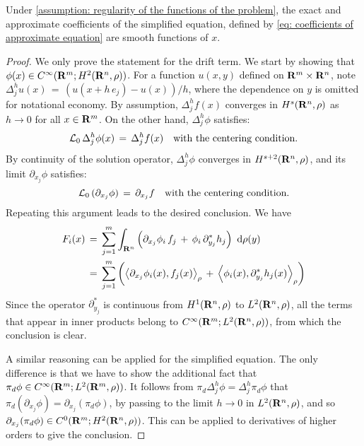 \begin{lemma}
    Under \cref{assumption: regularity of the functions of the problem}, the
    exact and approximate coefficients of the simplified equation, defined by 
    \cref{eq: coefficients of approximate equation} are smooth functions of $x$.
    \begin{proof}
        We only prove the statement for the drift term. We start by showing
        that $\phi(x) \in C^{\infty}(\mathbf R^m; H^{2}(\mathbf R^n, \rho))$.
        For a function $u(x,y)$ defined on $\mathbf R^m \times \mathbf R^n$, note
        $\Delta^h_j u(x)\,=\, (u(x+h\, e_j) - u(x))/h$, where the dependence on
        $y$ is omitted for notational economy. By assumption, $\Delta^h_j
        f(x)$ converges in $H^{s}(\mathbf R^n, \rho)$ as $h \to 0$ for all
        $x \in \mathbf R^m$. On the other hand, $\Delta^h_j \phi$ satisfies:
        $$ 
            \mathcal L_0 \, \Delta^h_j \phi(x) \,=\, \Delta^h_j f(x) \quad \text{with the centering condition}.
        $$
        By continuity of the solution operator, $\Delta^h_j \phi$ converges in
        $H^{s+2}(\mathbf R^n, \rho) $, and its limit $\partial_{x_j} \phi$ satisfies:
        $$ \mathcal L_0 \, (\partial_{x_j} \phi) \,=\, \partial_{x_j} f \quad
        \text{with the centering condition}.$$ Repeating this argument leads to
        the desired conclusion. We have
        \begin{align*}
            F_i(x) &\,=\, \sum^{m}_{j=1}  \int_{\mathbf R^n} \left(\partial_{x_j}\phi_i
                \, f_j\,+\, \phi_i\, \partial_{y_j}^* h_j\right) \,\,\mathrm d \rho(y) \\
            &\,=\, \sum^{m}_{j=1}
            \left(\left \langle \partial_{x_j}\phi_i(x),f_j(x) \right\rangle_{\rho}
                \,+\,\left \langle \phi_i(x),\partial_{y_j}^*h_j(x) \right\rangle_{\rho}\right) 
        \end{align*}
        Since the operator $\partial_{y_j}^*$ is continuous from
        $H^{1}(\mathbf R^n, \rho)$ to $L^{2}(\mathbf R^n,\rho)$, all the
        terms that appear in inner products belong to $C^{\infty}(\mathbf R^m;
            L^{2}(\mathbf R^n,\rho))$, from which the conclusion is clear. 

        A similar reasoning can be applied for the simplified equation. The only difference 
        is that we have to show the additional fact that $\pi_d \phi \in C^{\infty}(\mathbf R^m;
            L^{2}(\mathbf R^m,\rho))$. It follows from $\pi_d \Delta^h_j \phi =
        \Delta^h_j \pi_d \phi$ that $\pi_d (\partial_{x_j}\phi) =
        \partial_{x_j} (\pi_d \phi)$, by passing to the limit $h \to 0$ in
        $L^{2}(\mathbf R^n,\rho)$, and so $\partial_{x_j} (\pi_d \phi) \in C^{0}(\mathbf R^m;
            H^{2}(\mathbf R^n, \rho))$. This can be applied to derivatives
        of higher orders to give the conclusion. 
    \end{proof}
\end{lemma}

